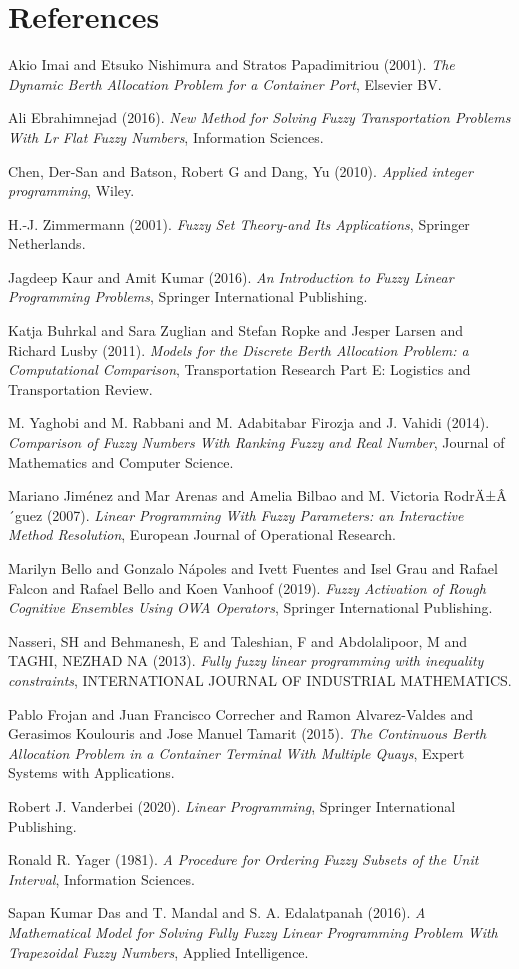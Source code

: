 \documentclass[11pt,a4paper,final]{article}
\begin{document}
\section{References}
\label{sec:orga7cba74}
\noindent
Akio Imai and Etsuko Nishimura and Stratos Papadimitriou (2001). \emph{The Dynamic Berth Allocation Problem for a Container Port}, Elsevier {BV}.

\noindent
Ali Ebrahimnejad (2016). \emph{New Method for Solving Fuzzy Transportation Problems With Lr Flat Fuzzy Numbers}, Information Sciences.

\noindent
Chen, Der-San and Batson, Robert G and Dang, Yu (2010). \emph{Applied integer programming}, Wiley.

\noindent
H.-J. Zimmermann (2001). \emph{Fuzzy Set Theory-and Its Applications}, Springer Netherlands.

\noindent
Jagdeep Kaur and Amit Kumar (2016). \emph{An Introduction to Fuzzy Linear Programming Problems}, Springer International Publishing.

\noindent
Katja Buhrkal and Sara Zuglian and Stefan Ropke and Jesper Larsen and Richard Lusby (2011). \emph{Models for the Discrete Berth Allocation Problem: a Computational Comparison}, Transportation Research Part E: Logistics and Transportation Review.

\noindent
M. Yaghobi and M. Rabbani and M. Adabitabar Firozja and J. Vahidi (2014). \emph{Comparison of Fuzzy Numbers With Ranking Fuzzy and Real Number}, Journal of Mathematics and Computer Science.

\noindent
Mariano Jim{\'e}nez and Mar Arenas and Amelia Bilbao and M. Victoria RodrÄ±Â´guez (2007). \emph{Linear Programming With Fuzzy Parameters: an Interactive Method Resolution}, European Journal of Operational Research.

\noindent
Marilyn Bello and Gonzalo N{\'a}poles and Ivett Fuentes and Isel Grau and Rafael Falcon and Rafael Bello and Koen Vanhoof (2019). \emph{Fuzzy Activation of Rough Cognitive Ensembles Using OWA Operators}, Springer International Publishing.

\noindent
Nasseri, SH and Behmanesh, E and Taleshian, F and Abdolalipoor, M and TAGHI, NEZHAD NA (2013). \emph{Fully fuzzy linear programming with inequality constraints}, INTERNATIONAL JOURNAL OF INDUSTRIAL MATHEMATICS.

\noindent
Pablo Frojan and Juan Francisco Correcher and Ramon Alvarez-Valdes and Gerasimos Koulouris and Jose Manuel Tamarit (2015). \emph{The Continuous Berth Allocation Problem in a Container Terminal With Multiple Quays}, Expert Systems with Applications.

\noindent
Robert J. Vanderbei (2020). \emph{Linear Programming}, Springer International Publishing.

\noindent
Ronald R. Yager (1981). \emph{A Procedure for Ordering Fuzzy Subsets of the Unit Interval}, Information Sciences.

\noindent
Sapan Kumar Das and T. Mandal and S. A. Edalatpanah (2016). \emph{A Mathematical Model for Solving Fully Fuzzy Linear Programming Problem With Trapezoidal Fuzzy Numbers}, Applied Intelligence.
\end{document}

